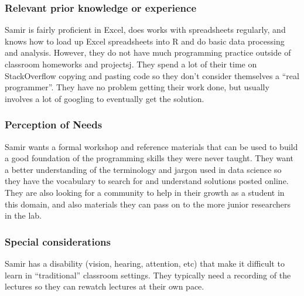 \documentclass[020-persona\_validation.tex]{subfiles}
\begin{document}
        \subsubsection{Relevant prior knowledge or experience}

            Samir is fairly proficient in Excel,
            does works with spreadsheets regularly, and
            knows how to load up Excel spreadsheets into R and do basic data processing and analysis.
            However,
            they do not have much programming practice outside of classroom homeworks and projectsj.
            They spend a lot of their time on StackOverflow copying and pasting code
            so they don't consider themselves a ``real programmer''.
            They have no problem getting their work done,
            but usually involves a lot of googling to eventually get the solution.

        \subsubsection{Perception of Needs}

            Samir wants a formal workshop and reference materials
            that can be used to build a good foundation of the programming skills they were never taught.
            They want a better understanding of the terminology and jargon used in data science
            so they have the vocabulary to search for and understand solutions posted online.
            They are also looking for a community to help in their growth as a student in this domain,
            and also materials they can pass on to the more junior researchers in the lab.

        \subsubsection{Special considerations}

            Samir has a disability (vision, hearing, attention, etc)
            that make it difficult to learn in ``traditional'' classroom settings.
            They typically need a recording of the lectures so they can rewatch lectures at their own pace.
\end{document}
